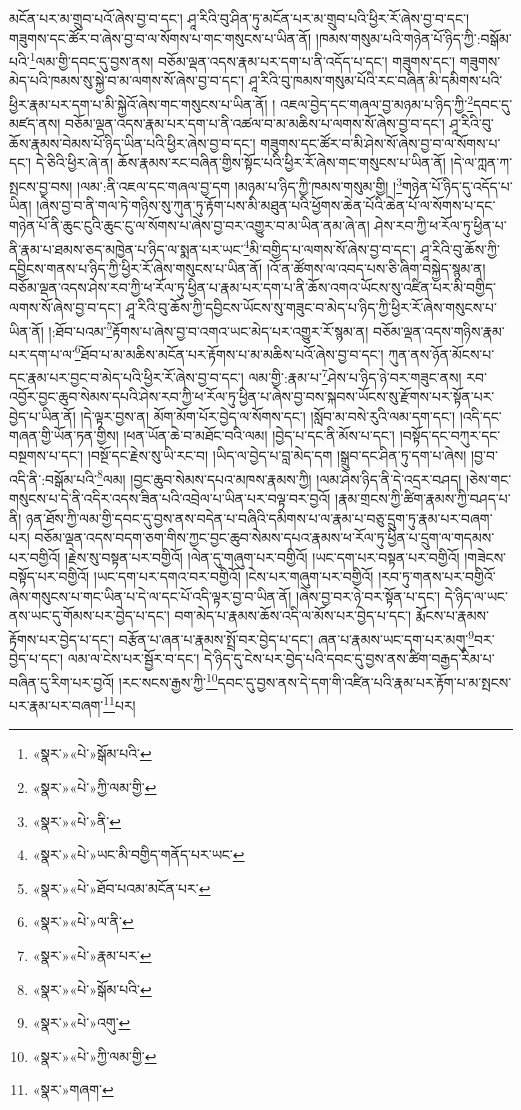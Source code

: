མངོན་པར་མ་གྲུབ་པའོ་ཞེས་བྱ་བ་དང་། ཤཱ་རིའི་བུ་ཤིན་ཏུ་མངོན་པར་མ་གྲུབ་པའི་ཕྱིར་རོ་ཞེས་བྱ་བ་དང་། གཟུགས་དང་ཚོར་བ་ཞེས་བྱ་བ་ལ་སོགས་པ་གང་གསུངས་པ་ཡིན་ནོ། །ཁམས་གསུམ་པའི་གཉེན་པོ་ཉིད་ཀྱི་:བསྒོམ་པའི་\footnote{«སྣར་»«པེ་»སྒོམ་པའི་}ལམ་གྱི་དབང་དུ་བྱས་ནས། བཅོམ་ལྡན་འདས་རྣམ་པར་དག་པ་ནི་འདོད་པ་དང་། གཟུགས་དང་། གཟུགས་མེད་པའི་ཁམས་སུ་སྐྱེ་བ་མ་ལགས་སོ་ཞེས་བྱ་བ་དང་། ཤཱ་རིའི་བུ་ཁམས་གསུམ་པོའི་རང་བཞིན་མི་དམིགས་པའི་ཕྱིར་རྣམ་པར་དག་པ་མི་སྐྱེའོ་ཞེས་གང་གསུངས་པ་ཡིན་ནོ། །
འཇལ་བྱེད་དང་གཞལ་བྱ་མཉམ་པ་ཉིད་ཀྱི་\footnote{«སྣར་»«པེ་»ཀྱི་ལམ་གྱི་}དབང་དུ་མཛད་ནས། བཅོམ་ལྡན་འདས་རྣམ་པར་དག་པ་ནི་འཚལ་བ་མ་མཆིས་པ་ལགས་སོ་ཞེས་བྱ་བ་དང་། ཤཱ་རིའི་བུ་ཆོས་རྣམས་བེམས་པོ་ཉིད་ཡིན་པའི་ཕྱིར་ཞེས་བྱ་བ་དང་། གཟུགས་དང་ཚོར་བ་མི་ཤེས་སོ་ཞེས་བྱ་བ་ལ་སོགས་པ་དང་། དེ་ཅིའི་ཕྱིར་ཞེ་ན། ཆོས་རྣམས་རང་བཞིན་གྱིས་སྟོང་པའི་ཕྱིར་རོ་ཞེས་གང་གསུངས་པ་ཡིན་ནོ། །དེ་ལ་ཀླན་ཀ་སྤངས་བྱ་བས། །ལམ་:ནི་འཇལ་དང་གཞལ་བྱ་དག །མཉམ་པ་ཉིད་ཀྱི་ཁམས་གསུམ་གྱི། །\footnote{«སྣར་»«པེ་»ནི་}གཉེན་པོ་ཉིད་དུ་འདོད་པ་ཡིན། །ཞེས་བྱ་བ་ནི་གལ་ཏེ་གཉིས་སུ་ཀུན་ཏུ་རྟོག་པས་མི་མཐུན་པའི་ཕྱོགས་ཆེན་པོའི་ཆེན་པོ་ལ་སོགས་པ་དང་གཉེན་པོ་ནི་ཆུང་ངུའི་ཆུང་ངུ་ལ་སོགས་པ་ཞེས་བྱ་བར་འགྱུར་བ་མ་ཡིན་ནམ་ཞེ་ན། ཤེས་རབ་ཀྱི་ཕ་རོལ་ཏུ་ཕྱིན་པ་ནི་རྣམ་པ་ཐམས་ཅད་མཁྱེན་པ་ཉིད་ལ་སྨན་པར་ཡང་\footnote{«སྣར་»«པེ་»ཡང་མི་བགྱིད་གནོད་པར་ཡང་}མི་བགྱིད་པ་ལགས་སོ་ཞེས་བྱ་བ་དང་། ཤཱ་རིའི་བུ་ཆོས་ཀྱི་དབྱིངས་གནས་པ་ཉིད་ཀྱི་ཕྱིར་རོ་ཞེས་གསུངས་པ་ཡིན་ནོ། །འོ་ན་ཚོགས་ལ་འབད་པས་ཅི་ཞིག་བསྐྱེད་སྙམ་ན། བཅོམ་ལྡན་འདས་ཤེས་རབ་ཀྱི་ཕ་རོལ་ཏུ་ཕྱིན་པ་རྣམ་པར་དག་པ་ནི་ཆོས་འགའ་ཡོངས་སུ་འཛིན་པར་མི་བགྱིད་ལགས་སོ་ཞེས་བྱ་བ་དང་། ཤཱ་རིའི་བུ་ཆོས་ཀྱི་དབྱིངས་ཡོངས་སུ་གཟུང་བ་མེད་པ་ཉིད་ཀྱི་ཕྱིར་རོ་ཞེས་གསུངས་པ་ཡིན་ནོ། །:ཐོབ་པའམ་\footnote{«སྣར་»«པེ་»ཐོབ་པའམ་མངོན་པར་}རྟོགས་པ་ཞེས་བྱ་བ་འགའ་ཡང་མེད་པར་འགྱུར་རོ་སྙམ་ན། བཅོམ་ལྡན་འདས་གཉིས་རྣམ་པར་དག་པ་ལ་\footnote{«སྣར་»«པེ་»ལ་ནི་}ཐོབ་པ་མ་མཆིས་མངོན་པར་རྟོགས་པ་མ་མཆིས་པའོ་ཞེས་བྱ་བ་དང་། ཀུན་ནས་ཉོན་མོངས་པ་དང་རྣམ་པར་བྱང་བ་མེད་པའི་ཕྱིར་རོ་ཞེས་བྱ་བ་དང་། ལམ་གྱི་:རྣམ་པ་\footnote{«སྣར་»«པེ་»རྣམ་པར་}ཤེས་པ་ཉིད་ཉེ་བར་གཟུང་ནས། རབ་འབྱོར་བྱང་ཆུབ་སེམས་དཔའི་ཤེས་རབ་ཀྱི་ཕ་རོལ་ཏུ་ཕྱིན་པ་ཞེས་བྱ་བས་སྐབས་ཡོངས་སུ་རྫོགས་པར་སྟོན་པར་བྱེད་པ་ཡིན་ནོ། །དེ་ལྟར་བྱས་ན། མོག་མོག་པོར་བྱེད་ལ་སོགས་དང་། །སློབ་མ་བསེ་རུའི་ལམ་དག་དང་། །འདི་དང་གཞན་གྱི་ཡོན་ཏན་གྱིས། །ཕན་ཡོན་ཆེ་བ་མཐོང་བའི་ལམ། །བྱེད་པ་དང་ནི་མོས་པ་དང་། །བསྟོད་དང་བཀུར་དང་བསྔགས་པ་དང་། །བསྔོ་དང་རྗེས་སུ་ཡི་རང་བ། །ཡིད་ལ་བྱེད་པ་བླ་མེད་དག །སྒྲུབ་དང་ཤིན་ཏུ་དག་པ་ཞེས། །བྱ་བ་འདི་ནི་:བསྒོམ་པའི་\footnote{«སྣར་»«པེ་»སྒོམ་པའི་}ལམ། །བྱང་ཆུབ་སེམས་དཔའ་མཁས་རྣམས་ཀྱི། །ལམ་ཤེས་ཉིད་ནི་དེ་འདྲར་བཤད། །ཅེས་གང་གསུངས་པ་དེ་ནི་འདིར་འདས་ཟིན་པའི་འབྲེལ་པ་ཡིན་པར་བལྟ་བར་བྱའོ། །རྣམ་གྲངས་ཀྱི་ཚིག་རྣམས་ཀྱི་བཤད་པ་ནི། ཉན་ཐོས་ཀྱི་ལམ་གྱི་དབང་དུ་བྱས་ནས་བདེན་པ་བཞིའི་དམིགས་པ་ལ་རྣམ་པ་བཅུ་དྲུག་ཏུ་རྣམ་པར་བཞག་པར། བཅོམ་ལྡན་འདས་བདག་ཅག་གིས་ཀྱང་བྱང་ཆུབ་སེམས་དཔའ་རྣམས་ཕ་རོལ་ཏུ་ཕྱིན་པ་དྲུག་ལ་གདམས་པར་བགྱིའོ། །རྗེས་སུ་བསྟན་པར་བགྱིའོ། །ལེན་དུ་གཞུག་པར་བགྱིའོ། །ཡང་དག་པར་བསྟན་པར་བགྱིའོ། །གཟེངས་བསྟོད་པར་བགྱིའོ། །ཡང་དག་པར་དགའ་བར་བགྱིའོ། །ངེས་པར་གཞུག་པར་བགྱིའོ། །རབ་ཏུ་གནས་པར་བགྱིའོ་ཞེས་གསུངས་པ་གང་ཡིན་པ་དེ་ལ་དང་པོ་འདི་ལྟར་བྱ་བ་ཡིན་ནོ། །ཞེས་བྱ་བར་ཉེ་བར་སྟོན་པ་དང་། དེ་ཉིད་ལ་ཡང་ནས་ཡང་དུ་གོམས་པར་བྱེད་པ་དང་། བག་མེད་པ་རྣམས་ཆོས་འདི་ལ་མོས་པར་བྱེད་པ་དང་། རྨོངས་པ་རྣམས་རྟོགས་པར་བྱེད་པ་དང་། བརྩོན་པ་ཞན་པ་རྣམས་སྤྲོ་བར་བྱེད་པ་དང་། ཞན་པ་རྣམས་ཡང་དག་པར་མགུ་\footnote{«སྣར་»«པེ་»འགུ་}བར་བྱེད་པ་དང་། ལམ་ལ་ངེས་པར་སྦྱོར་བ་དང་། དེ་ཉིད་དུ་ངེས་པར་བྱེད་པའི་དབང་དུ་བྱས་ནས་ཚིག་བརྒྱད་རིམ་པ་བཞིན་དུ་རིག་པར་བྱའོ། །རང་སངས་རྒྱས་ཀྱི་\footnote{«སྣར་»«པེ་»ཀྱི་ལམ་གྱི་}དབང་དུ་བྱས་ནས་དེ་དག་གི་འཛིན་པའི་རྣམ་པར་རྟོག་པ་མ་སྤངས་པར་རྣམ་པར་བཞག་\footnote{«སྣར་»གཞག་}པར། 